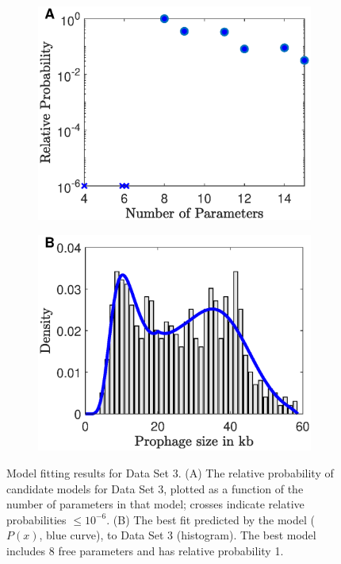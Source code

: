 \begin{figure}[H]
 \begin{subfigure}[t]{0.5\textwidth}
\centering
\includegraphics[scale=0.5]{aclame_rel.eps}
\end{subfigure}\hfill
\begin{subfigure}[t]{0.5\textwidth}
\includegraphics[scale=0.5]{aclame_best_pdf.eps}
\end{subfigure}\hfill
\caption[Model fitting results for Data Set 3.]{ Model fitting results for Data Set 3. (A) The relative probability of candidate models for Data Set 3, plotted as a function of the number of parameters in that model; crosses indicate relative probabilities $\leq 10^{-6}$.
 (B) The best fit predicted by the model ($P(x)$, blue curve), to Data Set 3 (histogram). The best model includes 8 free parameters and has relative probability 1. 
}
\end{figure}


